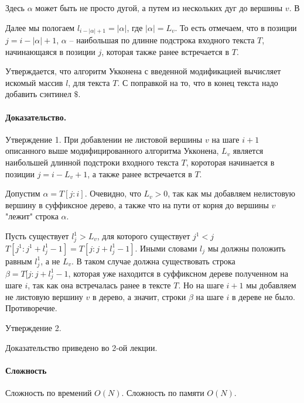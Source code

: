 \documentclass[12pt]{article}
\begin{document}
Здесь $ \alpha $ может быть не просто дугой, а путем из нескольких дуг до
вершины $ v $. В

Далее мы пологаем $ l_{i - |\alpha| + 1} = |\alpha| $, где $ |\alpha| = L_v $.
То есть отмечаем, что в позиции $ j = i - |\alpha| + 1 $,  $ \alpha $ --
наибольшая по длинне подстрока входного текста $ T $, начинающаяся в
позиции $ j $, которая также ранее встречается в $ T $.

Утверждается, что алгоритм Укконена с введенной модификацией вычисляет
искомый массив $ l $, для текста $ T $. С поправкой на то, что в конец
текста надо добавить сэнтинел $\$$.


\paragraph{Доказательство.}
Утверждение 1. При добавлении не листовой вершины $ v $ на шаге $ i + 1 $
описанного выше модифицированного алгоритма Укконена, $ L_v $ является
наибольшей длинной подстроки входного текста $ T $, короторая начинается в
позиции $ j = i - L_v + 1 $, а также ранее встречается в $ T $.

Допустим $ \alpha = T[j:i] $. Очевидно, что $ L_v > 0 $, так как мы
добавляем нелистовую вершину в суффиксное дерево, а также что на пути
от корня до вершины $ v $ "лежит" строка $ \alpha $.

Пусть существует $ l_j^1 > L_v $, для которого существует $ j^1 < j $
$ T[j^1:j^1 + l_j^1 - 1] = T[j:j + l_j^1 - 1] $. Иными словами $ l_j $
мы должны положить равным $ l_j^1 $, а не $ L_v $. В таком случае
должна существовать строка $ \beta = T[j:j + l_j^1 - 1$, которая уже
находится в суффиксном дереве полученном на шаге $ i $, так как она
встречалась ранее в тексте $ T $.
Но на шаге $ i + 1 $ мы добавляем не листовую вершину $ v $ в дерево, а
значит, строки $ \beta $ на шаге $ i $ в дереве не было. Противоречие.

Утверждение 2.



Доказательство приведено во 2-ой лекции.






\paragraph{Сложность}
Сложность по времений $ O(N) $.
Сложность по памяти $ O(N) $.
\end{document}
